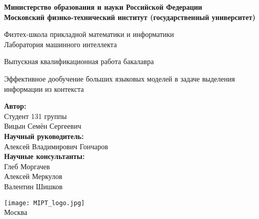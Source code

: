 \begin{center}
    \large\textbf{Министерство образования и науки Российской Федерации \\
    Московский физико-технический институт (государственный
    университет)} \\
    \vspace{1cm}

    Физтех-школа прикладной математики и информатики \\
    Лаборатория машинного интеллекта\\

    \vspace{3em}

    Выпускная квалификационная работа бакалавра
\end{center}

\begin{center}
    \vspace{\fill}
    \LARGE{Эффективное дообучение больших языковых моделей в задаче выделения информации из контекста }

    \vspace{\fill}
\end{center}


\begin{flushright}
    \textbf{Автор:} \\
    Студент 131 группы \\
    Вицын Семён Сергеевич \\
    \vspace{2em}
    \textbf{Научный руководитель:} \\
    Алексей Владимирович Гончаров \\
    \vspace{2em}
    \textbf{Научные консультанты:} \\
    Глеб Моргачев \\
    Алексей Меркулов \\
    Валентин Шишков \\
\end{flushright}

\vspace{7em}

\begin{center}
    \texttt{[image: MIPT\_logo.jpg]}\\
    Москва \the\year{}
\end{center}

\thispagestyle{empty}

\newpage
\setcounter{page}{2}
\fancyfoot[c]{\thepage}
\fancyhead[R]{}